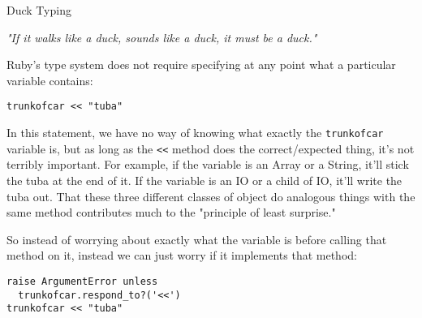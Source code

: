 \documentclass{slides}
\newcommand{\sh}[1]{
	{\Large #1}
	
}
\begin{document}
\begin{slide}
\sh{Duck Typing}
{\em"If it walks like a duck, sounds like a duck, it must be a duck."}

Ruby's type system does not require specifying at any point what a particular variable contains:
\begin{verbatim}
trunkofcar << "tuba"
\end{verbatim}
In this statement, we have no way of knowing what exactly the \verb|trunkofcar| variable is, but as long as the \verb|<<| method does the correct/expected thing, it's not terribly important.  For example, if the variable is an Array or a String, it'll stick the tuba at the end of it.  If the variable is an IO or a child of IO, it'll write the tuba out.  That these three different classes of object do analogous things with the same method contributes much to the "principle of least surprise."

So instead of worrying about exactly what the variable is before calling that method on it, instead we can just worry if it implements that method:
\begin{verbatim}
raise ArgumentError unless
  trunkofcar.respond_to?('<<')
trunkofcar << "tuba"
\end{verbatim}

\end{slide}
\end{document}
